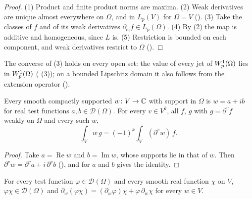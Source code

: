 \begin{proof}
\leanok
(1) Product and finite product norms are maxima. (2) Weak derivatives are unique almost
everywhere on $\Omega$, and in $L_p(V)$ for $\Omega = V$ ().
(3) Take the classes of $f$ and of its weak derivatives $\partial_{e_i} f \in L_p(\Omega)$.
(4) By (2) the map is additive and homogeneous, since $L$ is. (5) Restriction is bounded on each
component, and weak derivatives restrict to $\Omega$ ().
\end{proof}

The converse of (3) holds on every open set: the value of every jet of $W^{1}_{p}(\Omega)$
lies in $W^{1}_{p}(\Omega)$ ( (3)); on a bounded
Lipschitz domain it also follows from the extension operator
().

\begin{lemma}
\label{lem:weak-derivative-complex-test}
\leanok
{}
Every smooth compactly supported $w \colon V \to \mathbb{C}$ with support in $\Omega$ is
$w = a + i b$ for real test functions $a, b \in \mathcal D(\Omega)$. For every $v \in V^k$, all
$f$, $g$ with $g = \partial^v f$ weakly on $\Omega$ and every such $w$,
\[
  \int_V w \, g = (-1)^k \int_V (\partial^v w) \, f .
\]
\end{lemma}

\begin{proof}
\leanok
Take $a = \operatorname{Re} w$ and $b = \operatorname{Im} w$, whose supports lie in that of $w$.
Then $\partial^v w = \partial^v a + i \, \partial^v b$
(), and  for $a$ and
$b$ gives the identity.
\end{proof}

\begin{lemma}
\label{lem:test-function-product}
\leanok
{}
For every test function $\varphi \in \mathcal D(\Omega)$ and every smooth real function $\chi$
on $V$, $\varphi \chi \in \mathcal D(\Omega)$ and
$\partial_w (\varphi \chi) = (\partial_w \varphi) \chi + \varphi \, \partial_w \chi$ for every
$w \in V$.
\end{lemma}


